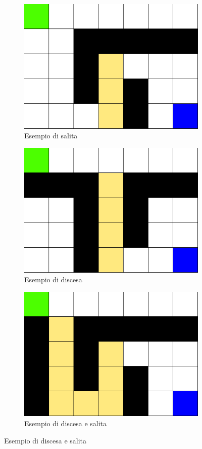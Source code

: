 \begin{figure}[H]
	\centering
	\begin{subfigure}{.33\textwidth}
		\centering
		\includegraphics[width=.7\textwidth]{img/salita.png}
		\caption{Esempio di salita}
	\end{subfigure}%
	\begin{subfigure}{.33\textwidth}
		\centering
		\includegraphics[width=.7\textwidth]{img/discesa.png}
		\caption{Esempio di discesa}
	\end{subfigure}%
	\begin{subfigure}{.33\textwidth}
		\centering
		\includegraphics[width=.7\textwidth]{img/salitadiscesa.png}
		\caption{Esempio di discesa e salita}
	\end{subfigure}%
\end{figure}


